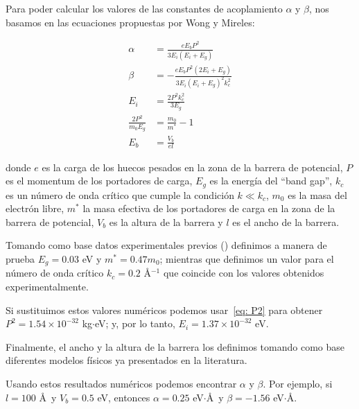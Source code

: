 Para poder calcular los valores de las constantes de acoplamiento $\alpha$ y $\beta$, nos basamos en las ecuaciones propuestas por Wong y Mireles\cite{WongUNAM2005}:

\begin{align}
    \alpha &= \frac{eE_b P^2}{3E_i\left( E_i + E_g \right)}\label{eq: alfa}\\
    \beta &= -\frac{eE_b P^2\left( 2E_i + E_g \right)}{3E_i\left( E_i + E_g \right)^2 k_c^2}\label{eq: beta}\\
    E_i &= \frac{2P^2 k_c^2}{3E_g} \label{eq: E_i}\\
    \frac{2P^2}{m_0 E_g} &= \frac{m_0}{m^*} - 1 \label{eq: P2}\\
    E_b &= \frac{V_b}{el} \label{eq: E_b}
\end{align}

\noindent donde $e$ es la carga de los huecos pesados en la zona de la barrera de potencial, $P$ es el momentum de los portadores de carga, $E_g$ es la energía del ``band gap'', $k_c$ es un número de onda crítico que cumple la condición $k \ll k_c$, $m_0$ es la masa del electrón libre, $m^*$ la masa efectiva de los portadores de carga en la zona de la barrera de potencial, $V_b$ es la altura de la barrera y $l$ es el ancho de la barrera.

Tomando como base datos experimentales previos (\cite{HuntSci2013, FuhrerSci2013, PallaBullMaterSci2016}) definimos a manera de prueba $E_g = 0.03$ eV y $m^* = 0.47m_0$; mientras que definimos un valor para el número de onda crítico $k_c = 0.2$ \AA$^{-1}$ que coincide con los valores obtenidos experimentalmente.

Si sustituimos estos valores numéricos podemos usar~\eqref{eq: P2} para obtener $P^2=1.54\times10^{-32}$ kg$\cdot$eV; y, por lo tanto, $E_i = 1.37\times10^{-32}$ eV\@.

Finalmente, el ancho y la altura de la barrera los definimos tomando como base diferentes modelos físicos ya presentados en la literatura.

Usando estos resultados numéricos podemos encontrar $\alpha$ y $\beta$.
Por ejemplo, si $l=100$ \AA\, y $V_b = 0.5$ eV, entonces $\alpha = 0.25$ eV$\cdot$\AA\, y $\beta = -1.56$ eV$\cdot$\AA.


